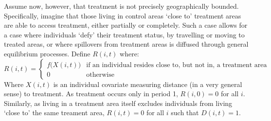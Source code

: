 Assume now, however, that treatment is not precisely geographically bounded.  
Specifically, imagine that those living in control areas `close to' treatment 
areas are able to access treatment, either partially or completely.  Such a 
case allows for a case where individuals `defy' their treatment status, by 
travelling or moving to treated areas, or where spillovers from treatment 
areas is diffused through general equilibrium processes.  Define $R(i,t)$ 
where:
\begin{equation}
\nonumber
 R(i,t) =
  \begin{cases}
   f\Big(X(i,t)\Big)   & \text{if an individual resides close to, but not in, a treatment area} \\
   0                            & \text{otherwise} 
  \end{cases}
\end{equation}
Where $X(i,t)$ is an individual covariate measuring distance (in a very general 
sense) to treatment. As treatment occurs only in 
period 1, $R(i,0)=0$ for all $i$.  Similarly, as living in a treatment area 
itself excludes individuals from living `close to' the same treament area, 
$R(i,t)=0$ for all $i$ such that $D(i,t)=1$.

